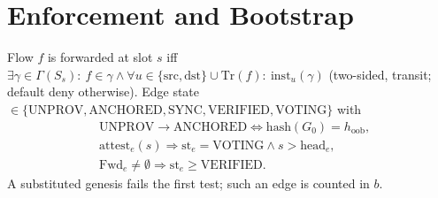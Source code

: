 \documentclass[conference]{IEEEtran}
\begin{document}
\section{Enforcement and Bootstrap}
Flow $f$ is forwarded at slot $s$ iff $\exists\gamma\in\Gamma(S_s):\ f\in\gamma\wedge\forall u\in\{\mathrm{src},\mathrm{dst}\}\cup\mathrm{Tr}(f):\ \mathrm{inst}_u(\gamma)$ (two-sided, transit; default deny otherwise). Edge state $\in\{\mathrm{UNPROV},\mathrm{ANCHORED},\mathrm{SYNC},\mathrm{VERIFIED},\mathrm{VOTING}\}$ with
\begin{align}
&\mathrm{UNPROV}\to\mathrm{ANCHORED}\iff \mathrm{hash}(G_0)=h_{\mathrm{oob}},\\
&\mathrm{attest}_e(s)\Rightarrow \mathrm{st}_e=\mathrm{VOTING}\wedge s>\mathrm{head}_e,\\
&\mathrm{Fwd}_e\neq\emptyset\Rightarrow \mathrm{st}_e\ge\mathrm{VERIFIED}.
\end{align}
A substituted genesis fails the first test; such an edge is counted in $b$.
\end{document}

